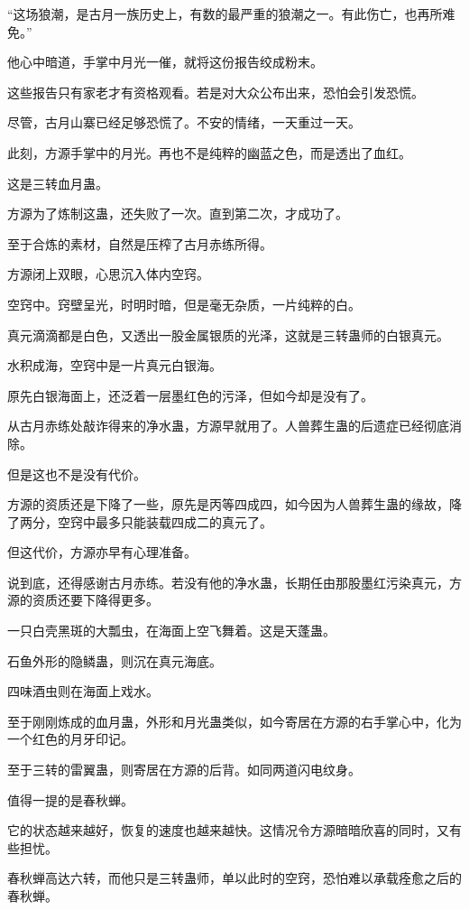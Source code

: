 \begin{this_body}
“这场狼潮，是古月一族历史上，有数的最严重的狼潮之一。有此伤亡，也再所难免。”

他心中暗道，手掌中月光一催，就将这份报告绞成粉末。

这些报告只有家老才有资格观看。若是对大众公布出来，恐怕会引发恐慌。

尽管，古月山寨已经足够恐慌了。不安的情绪，一天重过一天。

此刻，方源手掌中的月光。再也不是纯粹的幽蓝之色，而是透出了血红。

这是三转血月蛊。

方源为了炼制这蛊，还失败了一次。直到第二次，才成功了。

至于合炼的素材，自然是压榨了古月赤练所得。

方源闭上双眼，心思沉入体内空窍。

空窍中。窍壁呈光，时明时暗，但是毫无杂质，一片纯粹的白。

真元滴滴都是白色，又透出一股金属银质的光泽，这就是三转蛊师的白银真元。

水积成海，空窍中是一片真元白银海。

原先白银海面上，还泛着一层墨红色的污泽，但如今却是没有了。

从古月赤练处敲诈得来的净水蛊，方源早就用了。人兽葬生蛊的后遗症已经彻底消除。

但是这也不是没有代价。

方源的资质还是下降了一些，原先是丙等四成四，如今因为人兽葬生蛊的缘故，降了两分，空窍中最多只能装载四成二的真元了。

但这代价，方源亦早有心理准备。

说到底，还得感谢古月赤练。若没有他的净水蛊，长期任由那股墨红污染真元，方源的资质还要下降得更多。

一只白壳黑斑的大瓢虫，在海面上空飞舞着。这是天蓬蛊。

石鱼外形的隐鳞蛊，则沉在真元海底。

四味酒虫则在海面上戏水。

至于刚刚炼成的血月蛊，外形和月光蛊类似，如今寄居在方源的右手掌心中，化为一个红色的月牙印记。

至于三转的雷翼蛊，则寄居在方源的后背。如同两道闪电纹身。

值得一提的是春秋蝉。

它的状态越来越好，恢复的速度也越来越快。这情况令方源暗暗欣喜的同时，又有些担忧。

春秋蝉高达六转，而他只是三转蛊师，单以此时的空窍，恐怕难以承载痊愈之后的春秋蝉。


\end{this_body}
